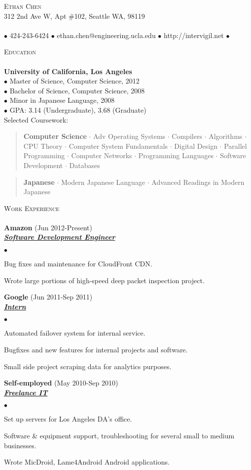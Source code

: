 \documentclass{article}
\newcommand{\area}[2]{\vspace*{-9pt} \begin{verse}\textbf{#1}   #2 \end{verse}  }
\newcommand{\lineunder}{\vspace*{-8pt} \\ \hspace*{-18pt} \hrulefill \\}
\newcommand{\header}[1]{{\hspace*{-15pt}\vspace*{6pt} \textsc{#1}} \vspace*{-6pt} \lineunder}
\newcommand{\employer}[3]{{ \textbf{#1} (#2)\\ \underline{\textbf{\emph{#3}}}\\  }}
\newcommand{\contact}[3]{
\vspace*{-8pt}
\begin{center}
{\LARGE \scshape {#1}}\\
#2 \lineunder
#3
\end{center}
\vspace*{-8pt}
}
\newenvironment{achievements}{\begin{list}{$\bullet$}{\topsep 0pt \itemsep -2pt}}{\vspace*{4pt}\end{list}}
\newcommand{\schoolwithcourses}[5]{
 \textbf{#1} \\
 $\bullet$ #2 \\
 $\bullet$ #3 \\
 $\bullet$ #4 \\
 $\bullet$ #5 \\  Selected Coursework:\\
\vspace*{5pt}
}
\begin{document}
\small
\smallskip
\vspace*{-44pt}

\contact{Ethan Chen}
{312 2nd Ave W, Apt \#102, Seattle WA, 98119}
{$\bullet$ 424-243-6424 $\bullet$ ethan.chen@engineering.ucla.edu $\bullet$ http://intervigil.net $\bullet$}

\header{Education}
\schoolwithcourses{University of California, Los Angeles}
{Master of Science, Computer Science, 2012}
{Bachelor of Science, Computer Science, 2008}
{Minor in Japanese Language, 2008}
{GPA: 3.14 (Undergraduate), 3.68 (Graduate)}
  \area{Computer Science}{ $\cdot$ Adv Operating Systems $\cdot$ Compilers $\cdot$ Algorithms $\cdot$ CPU Theory $\cdot$ Computer System Fundamentals $\cdot$ Digital Design $\cdot$ Parallel Programming $\cdot$ Computer Networks $\cdot$ Programming Languages $\cdot$ Software Development $\cdot$ Databases }
  \area{Japanese}{ $\cdot$ Modern Japanese Language $\cdot$ Advanced Readings in Modern Japanese }

\header{Work Experience}
\employer{Amazon}{Jun 2012-Present}{Software Development Engineer}
  \begin{achievements}
    \item Bug fixes and maintenance for CloudFront CDN.
    \item Wrote large portions of high-speed deep packet inspection project.
  \end{achievements}

\employer{Google}{Jun 2011-Sep 2011}{Intern}
  \begin{achievements}
    \item Automated failover system for internal service.
    \item Bugfixes and new features for internal projects and software.
    \item Small side project scraping data for analytics purposes.
  \end{achievements}

\employer{Self-employed}{May 2010-Sep 2010}{Freelance IT}
  \begin{achievements}
    \item Set up servers for Los Angeles DA's office.
    \item Software \& equipment support, troubleshooting for several small to medium businesses.
    \item Wrote MicDroid, Lame4Android Android applications.
  \end{achievements}
\end{document}
